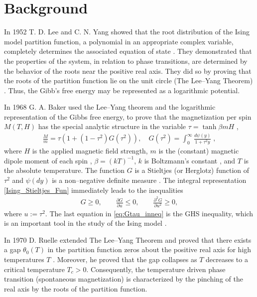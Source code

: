 \documentclass[english,12pt,jmp,graphicx]{revtex4-1}
\begin{document}
\section{Background}\label{sec:Background}
%
In 1952 T. D. Lee and C. N. Yang showed that the root distribution of
the Ising model partition function, a polynomial in an appropriate
complex variable, completely determines the associated equation of
state \cite{Yang:PR:404}. They demonstrated that the properties
of the system, in relation to phase transitions, are determined by the
behavior of the roots near the positive real axis. They did so by
proving that the roots of the partition function lie on the unit circle
(The Lee--Yang Theorem) \cite{Lee:PR:411,Ruelle-1969}. Thus, the Gibb's
free energy may be represented as a logarithmic potential.

In 1968 G. A. Baker used the
Lee--Yang theorem and the logarithmic representation of the Gibbs free
energy, to prove that the magnetization per spin $M(T,H)$
has the special analytic structure in the variable $\tau=\tanh{\beta mH}$
\cite{Baker:PRL-990}, 
%
\begin{align}\label{Ising_Stieltjes_Fun}
  \frac{M}{m} =\tau(1+(1-\tau^2)G(\tau^2)), \quad
  G(\tau^2)=\int_0^\infty\frac{d\psi(y)}{1+\tau^2y}\;, %
\end{align}
%
where $H$ is the applied magnetic field strength, $m$ is the
(constant) magnetic dipole moment of each spin \cite{Griffiths-1999},
$\beta=(kT)^{-1}$, $k$ is Boltzmann's constant \cite{Thompson-1988}, and
$T$ is the absolute temperature. The function $G$ is a Stieltjes (or
Herglotz) function of $\tau^2$ and $\psi(dy)$ is a non--negative definite
measure \cite{Baker:PRL-990}.  The integral representation
\eqref{Ising_Stieltjes_Fun} immediately leads to the inequalities   
%
\begin{align}\label{eq:Gtau_inneq}
  G\geq0, \qquad \frac{\partial G}{\partial u}\leq0, \qquad \frac{\partial^2G}{\partial u^2}\geq0,
\end{align}
%
where $u:=\tau^2$. The last equation in \eqref{eq:Gtau_inneq} is the GHS
inequality, which is an important tool in the study of the Ising model
\cite{Golden:JMP-5627}. 

In 1970 D. Ruelle extended The Lee--Yang Theorem and proved that
there exists a gap $\theta_0(T)$ in the partition function zeros about the
positive real axis for high temperatures $T$
\cite{Ruelle:PRL:303}. Moreover, he proved that the gap collapses as 
$T$ decreases to a critical temperature $T_c>0$. Consequently, the
temperature driven phase transition (spontaneous magnetization) is
characterized by the pinching of the real axis by the roots of the
partition function.
\end{document}
